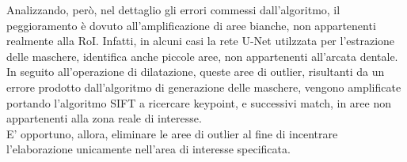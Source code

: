 \documentclass[12pt,a4paper,openright,twoside]{book}
\begin{document}
Analizzando, però, nel dettaglio gli errori commessi dall'algoritmo, il peggioramento è dovuto all'amplificazione di aree bianche, non appartenenti realmente alla RoI. Infatti, in alcuni casi la rete U-Net utilzzata per l'estrazione delle maschere, identifica anche piccole aree, non appartenenti all'arcata dentale.\\
In seguito all'operazione di dilatazione, queste aree di outlier, risultanti da un errore prodotto dall'algoritmo di generazione delle maschere, vengono amplificate portando l'algoritmo SIFT a ricercare keypoint, e successivi match, in aree non appartenenti alla zona reale di interesse.\\
E' opportuno, allora, eliminare le aree di outlier al fine di incentrare l'elaborazione unicamente nell'area di interesse specificata.


\end{document}

